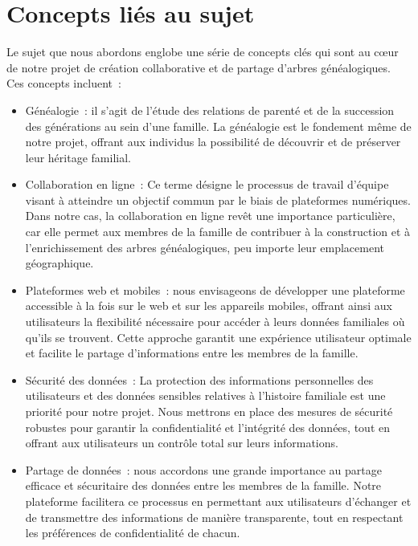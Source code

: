 \section{Concepts liés au sujet}
Le sujet que nous abordons englobe une série de concepts clés qui sont au cœur
de notre projet de création collaborative et de partage d’arbres généalogiques.
Ces concepts incluent :
\begin{itemize}
  \item Généalogie : il s’agit de l’étude des relations de parenté et de la
    succession des générations au sein d’une famille. La généalogie est le
    fondement même de notre projet, offrant aux individus la possibilité de
    découvrir et de préserver leur héritage familial.

  \item Collaboration en ligne : Ce terme désigne le processus de travail d’équipe
    visant à atteindre un objectif commun par le biais de plateformes numériques.
    Dans notre cas, la collaboration en ligne revêt une importance particulière,
    car elle permet aux membres de la famille de contribuer à la construction et
    à l’enrichissement des arbres généalogiques, peu importe leur emplacement géographique.

  \item Plateformes web et mobiles : nous envisageons de développer une plateforme
    accessible à la fois sur le web et sur les appareils mobiles, offrant ainsi
    aux utilisateurs la flexibilité nécessaire pour accéder à leurs données
    familiales où qu’ils se trouvent. Cette approche garantit une expérience
    utilisateur optimale et facilite le partage d’informations entre les membres de la famille.

  \item Sécurité des données : La protection des informations personnelles des
    utilisateurs et des données sensibles relatives à l’histoire familiale est
    une priorité pour notre projet. Nous mettrons en place des mesures de sécurité
    robustes pour garantir la confidentialité et l’intégrité des données, tout en
    offrant aux utilisateurs un contrôle total sur leurs informations.

  \item Partage de données : nous accordons une grande importance au partage
    efficace et sécuritaire des données entre les membres de la famille. Notre
    plateforme facilitera ce processus en permettant aux utilisateurs d’échanger
    et de transmettre des informations de manière transparente, tout en respectant
    les préférences de confidentialité de chacun.


\end{itemize}
